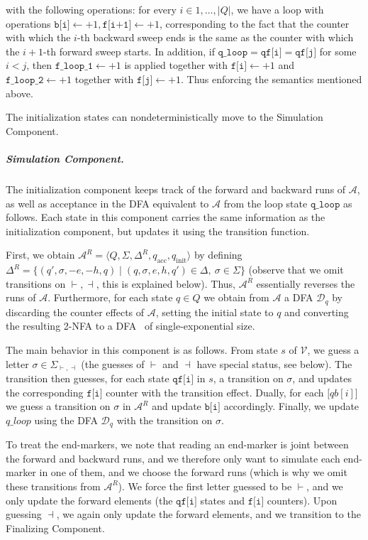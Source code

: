 \documentclass[USenglish]{lipics-v2021}
\newcommand{\tup}[1]{\langle #1 \rangle}
\newcommand{\lmark}{\vdash}
\newcommand{\rmark}{\dashv}
\newcommand{\initstate}{q_{\mathrm{init}}}
\newcommand{\accstate}{q_{\mathrm{acc}}}
\newcommand{\adds}[1]{\leftarrow #1}
\newcommand{\vf}[1]{\texttt{#1}}
\newcommand{\cA}{\mathcal{A}}
\newcommand{\cD}{\mathcal{D}}
\newcommand{\cV}{\mathcal{V}}
\begin{document}
with the following operations: for every $i\in 1,\ldots ,|Q|$, we have a loop with
operations $\vf{b[i]}\adds{+1},\vf{f[i+1]}\adds{+1}$, corresponding to the fact
that the counter with which the $i$-th backward sweep ends is the same as the
counter with which the $i+1$-th forward sweep starts.  In addition, if
$\vf{q\_loop}=\vf{qf[i]}=\vf{qf[j]}$ for some $i<j$, then
$\vf{f\_loop\_1}\adds{+1}$ is applied together with $\vf{f[i]}\adds{+1}$ and
$\vf{f\_loop\_2}\adds{+1}$ together with $\vf{f[j]}\adds{+1}$. Thus enforcing
the semantics mentioned above.

The initialization states can nondeterministically move to the Simulation
Component.
\subparagraph*{Simulation Component.} The initialization component keeps track
of the forward and backward runs of $\cA$, as well as acceptance in the DFA
equivalent to $\cA$ from the loop state $\vf{q\_loop}$ as follows.  Each state
in this component carries the same information as the initialization component,
but updates it using the transition function.

First, we obtain $\cA^R=\tup{Q,\Sigma,\Delta^R,\accstate,\initstate}$ by defining
$\Delta^R=\{(q',\sigma,-e,-h,q)\mid (q,\sigma,e,h,q')\in \Delta,\ \sigma\in \Sigma\}$ (observe that we omit
transitions on $\lmark,\rmark$, this is explained below).  Thus, $\cA^R$
essentially reverses the runs of $\cA$.  Furthermore, for each state $q\in Q$ we
obtain from $\cA$ a DFA $\cD_q$ by discarding the counter effects of $\cA$,
setting the initial state to $q$ and converting the resulting 2-NFA to a
DFA~\cite{shepherdson1959reduction,rabin1959finite,vardi1989note} of
single-exponential size.

The main behavior in this component is as follows. From state $s$ of $\cV$, we
guess a letter $\sigma\in \Sigma_{\lmark,\rmark}$ (the guesses of $\lmark$ and $\rmark$ have
special status, see below).  The transition then guesses, for each state
$\vf{qf[i]}$ in $s$, a transition on $\sigma$, and updates the corresponding
$\vf{f[i]}$ counter with the transition effect. Dually, for each $\vf[qb[i]]$ we
guess a transition on $\sigma$ in $\cA^R$ and update $\vf{b[i]}$ accordingly.
Finally, we update $q\_loop$ using the DFA $\cD_q$ with the transition on $\sigma$.

To treat the end-markers, we note that reading an end-marker is joint between
the forward and backward runs, and we therefore only want to simulate each
end-marker in one of them, and we choose the forward runs (which is why we omit
these transitions from $\cA^R$).  We force the first letter guessed to be
$\lmark$, and we only update the forward elements (the $\vf{qf[i]}$ states and
$\vf{f[i]}$ counters).  Upon guessing $\rmark$, we again only update the forward
elements, and we transition to the Finalizing Component.
\end{document}
